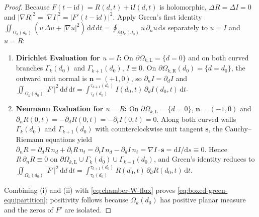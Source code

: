 \documentclass[11pt,reqno]{amsart}
\theoremstyle{definition}
\theoremstyle{remark}
\numberwithin{equation}{section}
\newcommand{\dd}{\mathrm{d}}
\newcommand{\ii}{\mathrm{i}}
\begin{document}
\begin{proof}
Because $F(t-\ii d) = R(d,t) + \ii I(d,t)$ is holomorphic, $\Delta R = \Delta I = 0$ and $|\nabla R|^2 = |\nabla I|^2 = |F'(t-\ii d)|^2$. Apply Green's first identity $\iint_{\Omega_k(d_0)} (u\,\Delta u + |\nabla u|^2)\,\dd d\,\dd t = \oint_{\partial\Omega_k(d_0)} u\,\partial_n u\,\dd s$ separately to $u = I$ and $u = R$:
\begin{enumerate}[label=(\roman*),leftmargin=2.0em]
\item \textbf{Dirichlet Evaluation for $u = I$:} On $\partial\Omega_{k,\mathrm{L}} = \{d=0\}$ and on both curved branches $\Gamma_k(d_0)$ and $\Gamma_{k+1}(d_0)$, $I \equiv 0$. On $\partial\Omega_{k,\mathrm{R}}(d_0) = \{d=d_0\}$, the outward unit normal is $\mathbf{n} = (+1,0)$, so $\partial_n I = \partial_d I$ and $\iint_{\Omega_k(d_0)} |F'|^2\,\dd d\,\dd t = \int_{\tau_k(d_0)}^{\tau_{k+1}(d_0)} I(d_0,t)\,\partial_d I(d_0,t)\,\dd t$.
\item \textbf{Neumann Evaluation for $u = R$:} On $\partial\Omega_{k,\mathrm{L}} = \{d=0\}$, $\mathbf{n} = (-1,0)$ and $\partial_n R(0,t) = -\partial_d R(0,t) = -\partial_t I(0,t) = 0$. Along both curved walls $\Gamma_k(d_0)$ and $\Gamma_{k+1}(d_0)$ with counterclockwise unit tangent $\mathbf{s}$, the Cauchy--Riemann equations yield $\partial_n R = \partial_d R\,n_d + \partial_t R\,n_t = \partial_t I\,n_d - \partial_d I\,n_t = \nabla I \cdot \mathbf{s} = \dd I/\dd s \equiv 0$. Hence $R\,\partial_n R \equiv 0$ on $\partial\Omega_{k,\mathrm{L}} \cup \Gamma_k(d_0) \cup \Gamma_{k+1}(d_0)$, and Green's identity reduces to $\iint_{\Omega_k(d_0)} |F'|^2\,\dd d\,\dd t = \int_{\tau_k(d_0)}^{\tau_{k+1}(d_0)} R(d_0,t)\,\partial_d R(d_0,t)\,\dd t$.
\end{enumerate}
Combining (i) and (ii) with \eqref{eq:chamber-W-flux} proves \eqref{eq:boxed-green-equipartition}; positivity follows because $\Omega_k(d_0)$ has positive planar measure and the zeros of $F'$ are isolated.
\end{proof}
\end{document}

